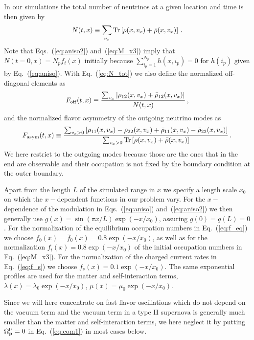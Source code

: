 \documentclass[prd,aps]{revtex4-2}
\begin{document}
In our simulations the total number of neutrinos at a given location and time is then given by
\begin{equation}\label{eq:N_tot}
  N(t,x)\equiv\sum_{v_x}{\rm Tr}\left[\rho(x,v_x)+\bar\rho(x,v_x)\right]\,.
\end{equation}
Note that Eqs.~(\ref{eq:aniso2}) and~(\ref{eq:M_x3}) imply that $N(t=0,x)=N_pf_i(x)$ initially because $\sum^{N_p}_{i_p=1}h(x,i_p)=0$
for $h(i_p)$ given by Eq.~(\ref{eq:aniso}).
With Eq.~(\ref{eq:N_tot}) we also define the normalized off-diagonal elements as
\begin{equation}\label{eq:F_off}
  F_{\rm off}(t,x)\equiv\frac{\sum_{v_x}\left|\rho_{12}(x,v_x)+\bar\rho_{12}(x,v_x)\right|}{N(t,x)}\,,
\end{equation}
and the normalized flavor asymmetry of the outgoing neutrino modes as
\begin{equation}\label{eq:F_asym}
  F_{\rm asym}(t,x)\equiv\frac{\sum_{v_x>0}\left[\rho_{11}(x,v_x)-\rho_{22}(x,v_x)+\bar\rho_{11}(x,v_x)-\bar\rho_{22}(x,v_x)\right]}
  {\sum_{v_x>0}{\rm Tr}\left[\rho(x,v_x)+\bar\rho(x,v_x)\right]}\,.
\end{equation}
We here restrict to the outgoing modes because those are the ones that in the end are observable and their occupation is
not fixed by the boundary condition at the outer boundary.

Apart from the length $L$ of the simulated range in $x$ we specify a length scale $x_0$ on which the $x-$dependent functions
in our problem vary. For the $x-$dependence of the modulation in
Eqs.~(\ref{eq:aniso}) and~(\ref{eq:aniso2}) we then generally use $g(x)=\sin(\pi x/L)\exp(-x/x_0)$, assuring $g(0)=g(L)=0$.
For the normalization of the equilibrium occupation numbers in Eq.~(\ref{eq:f_eq}) we choose $f_0(x)=\bar f_0(x)=0.8\exp(-x/x_0)$,
as well as for the normalization $f_i(x)=0.8\exp(-x/x_0)$ of the initial occupation numbers in Eq.~(\ref{eq:M_x3}).
For the normalization of the charged current rates in Eq.~(\ref{eq:f_s}) we choose $f_s(x)=0.1\exp(-x/x_0)$.
The same exponential profiles are used for the matter and self-interaction terms, $\lambda(x)=\lambda_0\exp(-x/x_0)$,
$\mu(x)=\mu_0\exp(-x/x_0)$.

Since we will here concentrate on fast flavor oscillations which do not depend on the vacuum term
and the vacuum term in a type II supernova is generally
much smaller than the matter and self-interaction terms, we here neglect it by putting $\Omega^0_{\bf p}=0$ in
Eq.~(\ref{eq:eom1}) in most cases below.
\end{document}
